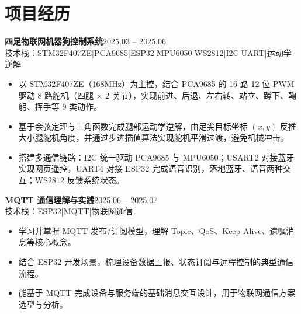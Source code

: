\documentclass[10pt,a4paper]{article}
\newcommand{\projectblock}[3]{%
    {\bfseries\color{darktext}#1}\hfill{\color{graytext}#2}\\%
    {\small\color{graytext}#3}%
    \vspace{0.2em}%
}
\begin{document}
\section{\faProjectDiagram\hspace{0.4em}项目经历}

\projectblock{四足物联网机器狗控制系统}{2025.03 -- 2025.06}{技术栈：STM32F407ZE\hspace{0.3em}|\hspace{0.3em}PCA9685\hspace{0.3em}|\hspace{0.3em}ESP32\hspace{0.3em}|\hspace{0.3em}MPU6050\hspace{0.3em}|\hspace{0.3em}WS2812\hspace{0.3em}|\hspace{0.3em}I2C\hspace{0.3em}|\hspace{0.3em}UART\hspace{0.3em}|\hspace{0.3em}运动学逆解}

\begin{itemize}[leftmargin=1.5em, itemsep=2pt, parsep=0pt, topsep=2pt]
    \item 以 STM32F407ZE（168MHz）为主控，结合 PCA9685 的 16 路 12 位 PWM 驱动 8 路舵机（四腿 $\times$ 2 关节），实现前进、后退、左右转、站立、蹲下、鞠躬、挥手等 9 类动作。
    \item 基于余弦定理与三角函数完成腿部运动学逆解，由足尖目标坐标 $(x, y)$ 反推大小腿舵机角度，并通过步进插值算法实现舵机平滑过渡，避免机械冲击。
    \item 搭建多通信链路：I2C 统一驱动 PCA9685 与 MPU6050；USART2 对接蓝牙实现网页遥控，UART4 对接 ESP32 完成语音识别，落地蓝牙、语音两种交互；WS2812 反馈系统状态。
\end{itemize}

\vspace{0.3em}

\projectblock{MQTT 通信理解与实践}{2025.06 -- 2025.07}{技术栈：ESP32\hspace{0.3em}|\hspace{0.3em}MQTT\hspace{0.3em}|\hspace{0.3em}物联网通信}

\begin{itemize}[leftmargin=1.5em, itemsep=2pt, parsep=0pt, topsep=2pt]
    \item 学习并掌握 MQTT 发布/订阅模型，理解 Topic、QoS、Keep Alive、遗嘱消息等核心概念。
    \item 结合 ESP32 开发场景，梳理设备数据上报、状态订阅与远程控制的典型通信流程。
    \item 能基于 MQTT 完成设备与服务端的基础消息交互设计，用于物联网通信方案选型与分析。
\end{itemize}
\end{document}
